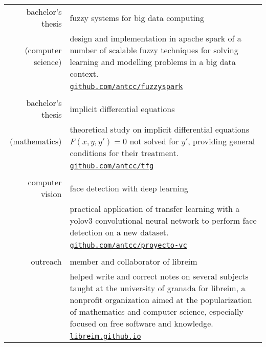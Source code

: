 \documentclass[a4paper,10pt]{article} %
\begin{document}
\begin{tabular}{r|p{11cm}}
bachelor's thesis  & fuzzy systems for big data computing\\
\footnotesize{(computer science)} & \footnotesize{design and implementation in apache spark of a number of scalable fuzzy techniques for solving learning and modelling problems in a big data context.}\\
& \footnotesize{\href{https://github.com/antcc/fuzzyspark}{\texttt{github.com/antcc/fuzzyspark}}}\\
\multicolumn{2}{c}{} \\

bachelor's thesis & implicit differential equations\\
\footnotesize{(mathematics)} & \footnotesize{theoretical study on implicit differential equations $F(x, y, y')=0$ not solved for $y'$, providing general conditions for their treatment.}\\
& \footnotesize{\href{https://github.com/antcc/tfg}{\texttt{github.com/antcc/tfg}}}\\
\multicolumn{2}{c}{} \\

computer vision & face detection with deep learning\\
& \footnotesize{practical application of transfer learning with a yolov3 convolutional neural network to perform face detection on a new dataset.}\\
& \footnotesize{\href{https://github.com/antcc/proyecto-vc}{\texttt{github.com/antcc/proyecto-vc}}}\\
\multicolumn{2}{c}{} \\


outreach & member and collaborator of libreim\\
& \footnotesize{helped write and correct notes on several subjects taught at the university of granada for libreim, a nonprofit organization aimed at the popularization of mathematics and computer science, especially focused on free software and knowledge.}\\
& \footnotesize{\href{https://libreim.github.io/}{\texttt{libreim.github.io}}}\\
\end{tabular}
\end{document}
